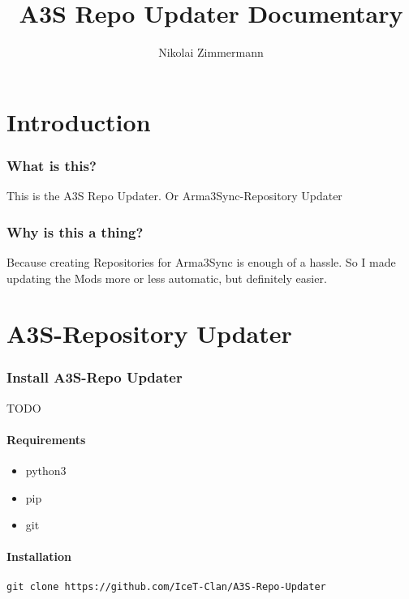 \documentclass[a4paper]{article}
\title{A3S Repo Updater Documentary}
\author{Nikolai Zimmermann}
\begin{document}
\begin{titlepage}
	\begin{center}
		
	\end{center}
\end{titlepage}
	
	\tableofcontents
	\newpage
	
	\part{Introduction}
		\section{What is this?}
			This is the A3S Repo Updater. Or Arma3Sync-Repository Updater
		\section{Why is this a thing?}
			Because creating Repositories for Arma3Sync is enough of a hassle. So I made updating the Mods more or less automatic, but definitely easier.	
	\newpage
	
	\part{A3S-Repository Updater}
		\section{Install A3S-Repo Updater}
			TODO
			\subsection{Requirements}
				\begin{itemize}[noitemsep]
				\item python3
				\item pip
				\item git
				\end{itemize}

			\subsection{Installation}
				\lstset{language=sh}
				\begin{lstlisting}
git clone https://github.com/IceT-Clan/A3S-Repo-Updater
				\end{lstlisting}
	
\end{document}

